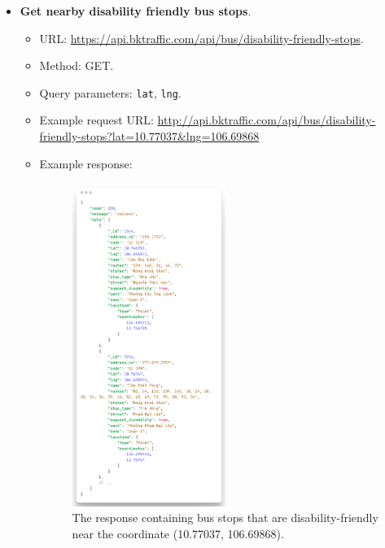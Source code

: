 \begin{itemize}
    \newpage
    \item \textbf{Get nearby disability friendly bus stops}.
    \begin{itemize}
        \item URL: \url{https://api.bktraffic.com/api/bus/disability-friendly-stops}.
        \item Method: GET.
        \item Query parameters: \lstinline{lat}, \lstinline{lng}.
        \item Example request URL: \url{http://api.bktraffic.com/api/bus/disability-friendly-stops?lat=10.77037&lng=106.69868}
        \item Example response:
        \begin{figure}[H]
            \centering
            \includegraphics[width=0.5\textwidth]{assets/images/Implementation/nearby_disable_response.png}
            \caption{The response containing bus stops that are disability-friendly near the coordinate (10.77037, 106.69868).}
            \label{fig:nearby_disable_response}
        \end{figure}
    \end{itemize}


\end{itemize}
